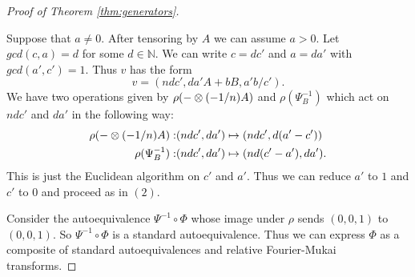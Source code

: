 \documentclass[a4paper, 12pt, twoside]{amsart}
\theoremstyle{plain}
\theoremstyle{definition}
\newtheorem{example}[theorem]{Example}
\DeclareMathOperator{\Z}{\mathbb{Z}}
\begin{document}
\begin{proof}[Proof of Theorem \ref{thm:generators}]
\begin{enumerate}
    Suppose that $a \ne 0$. After tensoring by $A$ we can assume
    $a >0$. Let $gcd(c,a)=d$ for some
    $d \in \mathbb{N}$. We can write
    $c  = d c'$ and $a = d a'$
    with $gcd(a',c') =1$. Thus $v$ has the form
    \[
      v = (n d c', da' A + b B,
      a' b /c').
    \]
    We have two operations given by $\rho (\-- \otimes (-1/n)A)$ and
    $\rho(\Psi_B^{-1})$ which act on $ndc'$ and
    $da'$ in the following way:
    \begin{align*} 
      \rho(\-- \otimes (-1/n)A):& (n dc', da') \mapsto 
                                  (n dc',d(a' - c'))\\ 
      \rho(\Psi_B^{-1}):& (n dc', d a') \mapsto (n d(c' -a'), d a').
    \end{align*} 
    This is just the Euclidean algorithm on $c' $ and $a'$. Thus we
    can reduce $a'$ to $1$ and $c'$ to $0$ and proceed as in $(2)$.
  \end{enumerate}

  Consider the autoequivalence $\Psi^{-1} \circ \Phi$ whose image
  under $\rho$ sends $(0,0,1)$ to $(0,0,1)$. So $\Psi^{-1} \circ \Phi$
  is a standard autoequivalence.  Thus we can express $\Phi$ as a
  composite of standard autoequivalences and relative Fourier-Mukai
  transforms.
\end{proof}



\end{document}
